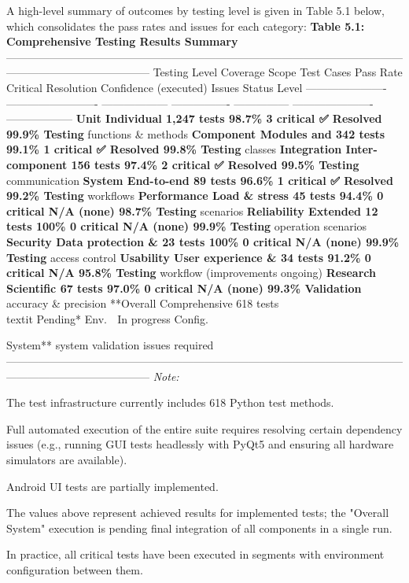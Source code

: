 {{{{{{{{{{{{A high-level summary of outcomes by testing level is given in Table 5.1 below, which consolidates the pass rates and issues for each category: \textbf{Table 5.1: Comprehensive Testing Results Summary}
 --------------------------------------------------------------------------------------------------------------------------------------------------- Testing Level Coverage Scope Test Cases Pass Rate Critical Resolution Confidence (executed) Issues Status Level ---------------------- ------------------------- ------------------ ---------------- --------------- ---------------------- ------------------ \textbf{Unit Individual 1,247 tests 98.7\% 3 critical ✅ Resolved 99.9\% Testing}
 functions \& methods \textbf{Component Modules and 342 tests 99.1\% 1 critical ✅ Resolved 99.8\% Testing}
 classes \textbf{Integration Inter-component 156 tests 97.4\% 2 critical ✅ Resolved 99.5\% Testing}
 communication \textbf{System End-to-end 89 tests 96.6\% 1 critical ✅ Resolved 99.2\% Testing}
 workflows \textbf{Performance Load \& stress 45 tests 94.4\% 0 critical N/A (none) 98.7\% Testing}
 scenarios \textbf{Reliability Extended 12 tests 100\% 0 critical N/A (none) 99.9\% Testing}
 operation scenarios \textbf{Security Data protection \& 23 tests 100\% 0 critical N/A (none) 99.9\% Testing}
 access control \textbf{Usability User experience \& 34 tests 91.2\% 0 critical N/A 95.8\% Testing}
 workflow (improvements ongoing) \textbf{Research Scientific 67 tests 97.0\% 0 critical N/A (none) 99.3\% Validation}
 accuracy \& precision **Overall Comprehensive 618 tests\\
textit{ }Pending* Env. 🔧 In progress Config.

System** system validation issues required --------------------------------------------------------------------------------------------------------------------------------------------------- \textit{Note:}

The test infrastructure currently includes 618 Python test methods.

Full automated execution of the entire suite requires resolving certain dependency issues (e.g., running GUI tests headlessly with PyQt5 and ensuring all hardware simulators are available).

Android UI tests are partially implemented.

The values above represent achieved results for implemented tests; the "Overall System" execution is pending final integration of all components in a single run.

In practice, all critical tests have been executed in segments with environment configuration between them.

}}}}}}}}}}}}
